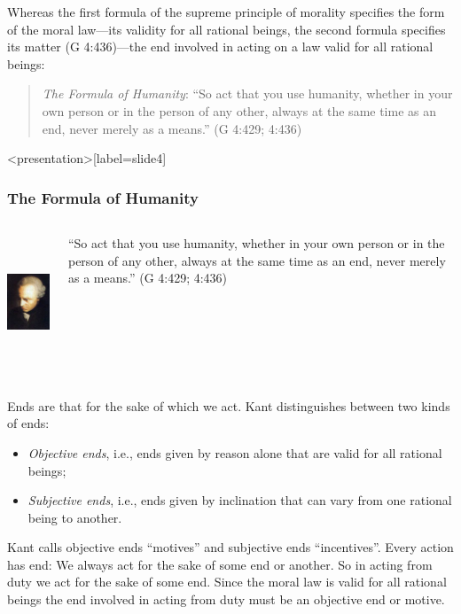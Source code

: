 Whereas the first formula of the supreme principle of morality specifies the form of the moral law---its validity for all rational beings, the second formula specifies its matter (G 4:436)---the end involved in acting on a law valid for all rational beings:
\begin{quote}
    \emph{The Formula of Humanity}: ``So act that you use humanity, whether in your own person or in the person of any other, always at the same time as an end, never merely as a means.'' (G 4:429; 4:436)
\end{quote}

\change

\begin{frame}<presentation>[label=slide4]
    \frametitle{The Formula of Humanity}
        \begin{columns}
            \begin{column}{3cm}
                \includegraphics[height=4cm]{../../graphics/kant.jpg}
            \end{column}
            \begin{column}{7cm}
                ``So act that you use humanity, whether in your own person or in the person of any other, always at the same time as an end, never merely as a means.'' (G 4:429; 4:436)
            \end{column}
        \end{columns}
\end{frame}

Ends are that for the sake of which we act. Kant distinguishes between two kinds of ends:
\begin{itemize}
\item \emph{Objective ends}, i.e., ends given by reason alone that are valid for all rational beings;
\item \emph{Subjective ends}, i.e., ends given by inclination that can vary from one rational being to another.
\end{itemize}

Kant calls objective ends ``motives'' and subjective ends ``incentives''. Every action has end: We always act for the sake of some end or another. So in acting from duty we act for the sake of some end. Since the moral law is valid for all rational beings the end involved in acting from duty must be an objective end or motive.

